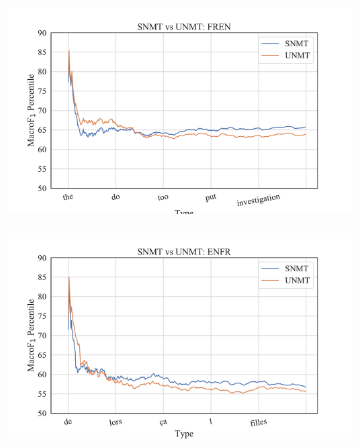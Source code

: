 \begin{figure}[ht]
    \centering

    \begin{subfigure}[b]{0.9\linewidth}
    \includegraphics[width=\linewidth,trim={13mm 5mm 25mm 10mm},clip]{img/s_unmt-fren-maf1.pdf}
    \end{subfigure}
    \hfill 
    \begin{subfigure}[b]{0.9\linewidth}
    \includegraphics[width=\linewidth,trim={13mm 7mm 25mm 10mm},clip]{img/s_unmt-enfr-maf1.pdf}
    \end{subfigure}
    

\end{figure}
